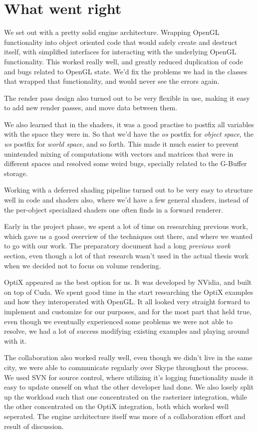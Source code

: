 \section{What went right}
We set out with a pretty solid engine architecture. Wrapping OpenGL functionality into object oriented code that would safely create and destruct itself, with simplified interfaces for interacting with the underlying OpenGL functionality. This worked really well, and greatly reduced duplication of code and bugs related to OpenGL state. We'd fix the problems we had in the classes that wrapped that functionality, and would never see the errors again.

The render pass design also turned out to be very flexible in use, making it easy to add new render passes, and move data between them.

We also learned that in the shaders, it was a good practise to postfix all variables with the space they were in. So that we'd have the \emph{os} postfix for \emph{object space}, the \emph{ws} postfix for \emph{world space}, and so forth. This made it much easier to prevent unintended mixing of computations with vectors and matrices that were in different spaces and resolved some weird bugs, specially related to the G-Buffer storage.

Working with a deferred shading pipeline turned out to be very easy to structure well in code and shaders also, where we'd have a few general shaders, instead of the per-object specialized shaders one often finds in a forward renderer.

Early in the project phase, we spent a lot of time on researching previous work, which gave us a good overview of the techniques out there, and where we wanted to go with our work. The preparatory document had a long \emph{previous work} section, even though a lot of that research wasn't used in the actual thesis work when we decided not to focus on volume rendering.

OptiX appeared as the best option for us. It was developed by NVidia, and built on top of Cuda. We spent good time in the start researching the OptiX examples and how they interoperated with OpenGL. It all looked very straight forward to implement and customize for our purposes, and for the most part that held true, even though we eventually experienced some problems we were not able to resolve, we had a lot of success modifying existing examples and playing around with it.

The collaboration also worked really well, even though we didn't live in the same city, we were able to communicate regularly over Skype throughout the process. We used SVN for source control, where utilizing it's logging functionality made it easy to update oneself on what the other developer had done. We also losely split up the workload such that one concentrated on the rasterizer integration, while the other concentrated on the OptiX integration, both which worked well seperated. The engine architecture itself was more of a collaboration effort and result of discussion.

